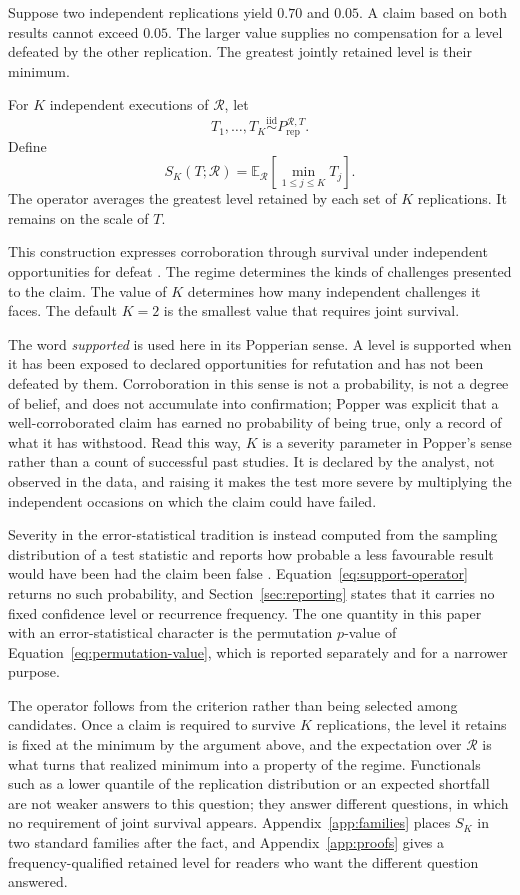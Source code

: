 \documentclass[11pt]{article}
\newcommand{\Regime}{\mathcal{R}}
\newcommand{\E}{\mathbb{E}}
\newcommand{\iid}{\mathrel{\overset{\mathrm{iid}}{\sim}}}
\theoremstyle{remark}
\begin{document}
Suppose two independent replications yield $0.70$ and $0.05$. A claim based on both results cannot exceed $0.05$. The larger value supplies no compensation for a level defeated by the other replication. The greatest jointly retained level is their minimum.

For $K$ independent executions of $\Regime$, let
\[
T_1,\ldots,T_K
\iid
P_{\mathrm{rep}}^{\Regime,T}.
\]
Define
\begin{equation}
S_K(T;\Regime)
=
\E_{\Regime}
\left[
\min_{1\leq j\leq K}T_j
\right].
\label{eq:support-operator}
\end{equation}
The operator averages the greatest level retained by each set of $K$ replications. It remains on the scale of $T$.

This construction expresses corroboration through survival under independent opportunities for defeat \cite{popper1959logic}. The regime determines the kinds of challenges presented to the claim. The value of $K$ determines how many independent challenges it faces. The default $K=2$ is the smallest value that requires joint survival.

The word \emph{supported} is used here in its Popperian sense. A level is supported when it has been exposed to declared opportunities for refutation and has not been defeated by them. Corroboration in this sense is not a probability, is not a degree of belief, and does not accumulate into confirmation; Popper was explicit that a well-corroborated claim has earned no probability of being true, only a record of what it has withstood. Read this way, $K$ is a severity parameter in Popper's sense rather than a count of successful past studies. It is declared by the analyst, not observed in the data, and raising it makes the test more severe by multiplying the independent occasions on which the claim could have failed.

Severity in the error-statistical tradition is instead computed from the sampling distribution of a test statistic and reports how probable a less favourable result would have been had the claim been false \cite{mayo1996error}. Equation~\eqref{eq:support-operator} returns no such probability, and Section~\ref{sec:reporting} states that it carries no fixed confidence level or recurrence frequency. The one quantity in this paper with an error-statistical character is the permutation $p$-value of Equation~\eqref{eq:permutation-value}, which is reported separately and for a narrower purpose.

The operator follows from the criterion rather than being selected among candidates. Once a claim is required to survive $K$ replications, the level it retains is fixed at the minimum by the argument above, and the expectation over $\Regime$ is what turns that realized minimum into a property of the regime. Functionals such as a lower quantile of the replication distribution or an expected shortfall are not weaker answers to this question; they answer different questions, in which no requirement of joint survival appears. Appendix~\ref{app:families} places $S_K$ in two standard families after the fact, and Appendix~\ref{app:proofs} gives a frequency-qualified retained level for readers who want the different question answered.
\end{document}
